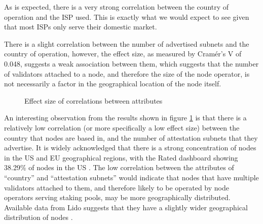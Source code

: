 \documentclass[conference]{IEEEtran}
\begin{document}
As is expected, there is a very strong correlation between the country of operation and the ISP used.  This is exactly what we would expect to see given that most ISPs only serve their domestic market.

There is a slight correlation between the number of advertised subnets and the country of operation, however, the effect size, as measured by Cramér's V of 0.048, suggests a weak association between them, which suggests that the number of validators attached to a node, and therefore the size of the node operator, is not necessarily a factor in the geographical location of the node itself.

\begin{figure}[htbp]
    \centering
    \caption{Effect size of correlations between attributes}
    \label{fig:relative-level-of-correlation-between-attributes}
\end{figure}

An interesting observation from the results shown in figure \ref{fig:relative-level-of-correlation-between-attributes} is that there is a relatively low correlation (or more specifically a low effect size) between the country that nodes are based in, and the number of attestation subnets that they advertise.  It is widely acknowledged that there is a strong concentration of nodes in the US and EU geographical regions, with the Rated dashboard showing 38.29\% of nodes in the US \cite{ratednetwork2024}.  The low correlation between the attributes of ``country'' and ``attestation subnets'' would indicate that nodes that have multiple validators attached to them, and therefore likely to be operated by node operators serving staking pools, may be more geographically distributed.  Available data from Lido suggests that they have a slightly wider geographical distribution of nodes \cite{lido2024}.
\end{document}
